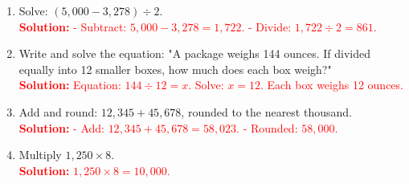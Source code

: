 \documentclass[12pt]{article}
\begin{document}
\begin{tcolorbox}[colframe=black!60, colback=white, 
coltitle=black, colbacktitle=black!15, fonttitle=\bfseries\Large, 
title=Exercises, halign title=center, left=10pt, right=10pt, top=10pt, bottom=60pt]
\begin{enumerate}[itemsep=2em]
    \item Solve: \( (5,000 - 3,278) \div 2 \).\\
    \textcolor{red}{\textbf{Solution:} 
    - Subtract: \( 5,000 - 3,278 = 1,722 \). 
    - Divide: \( 1,722 \div 2 = 861 \).}

    \item Write and solve the equation: "A package weighs 144 ounces. If divided equally into 12 smaller boxes, how much does each box weigh?"\\
    \textcolor{red}{\textbf{Solution:} 
    Equation: \( 144 \div 12 = x \). Solve: \( x = 12 \). Each box weighs 12 ounces.}

    \item Add and round: \( 12,345 + 45,678 \), rounded to the nearest thousand.\\
    \textcolor{red}{\textbf{Solution:} 
    - Add: \( 12,345 + 45,678 = 58,023 \). 
    - Rounded: \( 58,000 \).}

    \item Multiply \( 1,250 \times 8 \).\\
    \textcolor{red}{\textbf{Solution:} \( 1,250 \times 8 = 10,000 \).}
\end{enumerate}
\end{tcolorbox}

\vspace{1em}
\end{document}

